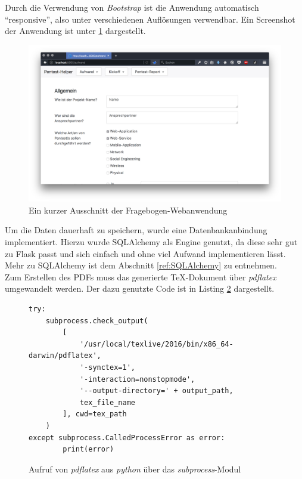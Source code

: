 Durch die Verwendung von \textit{Bootstrap} ist die Anwendung automatisch "`responsive"', also unter verschiedenen Auflösungen verwendbar. Ein Screenshot der Anwendung ist unter \ref{fig:FragWeb} dargestellt.

\begin{figure}[htbp]
	\centering
	\includegraphics[width=\textwidth]{bilder/pentest_prozesse/vorbereitung/fragebogen_web.png}
	\caption{Ein kurzer Ausschnitt der Fragebogen-Webanwendung}
	\label{fig:FragWeb}
\end{figure}

Um die Daten dauerhaft zu speichern, wurde eine Datenbankanbindung implementiert. Hierzu wurde SQLAlchemy als Engine genutzt, da diese sehr gut zu Flask passt und sich einfach und ohne viel Aufwand implementieren lässt. Mehr zu SQLAlchemy ist dem Abschnitt \ref{ref:SQLAlchemy} zu entnehmen.\\

Zum Erstellen des PDFs muss das generierte TeX-Dokument über \textit{pdflatex} umgewandelt werden. Der dazu genutzte Code ist in Listing \ref{lis:PenProzAufwPDFLatex} dargestellt.

\begin{figure}[htbp]
\begin{lstlisting}
try:
    subprocess.check_output(
        [
            '/usr/local/texlive/2016/bin/x86_64-darwin/pdflatex',
            '-synctex=1',
            '-interaction=nonstopmode',
            '--output-directory=' + output_path,
            tex_file_name
        ], cwd=tex_path
    )
except subprocess.CalledProcessError as error:
        print(error)
\end{lstlisting}
\caption{Aufruf von \textit{pdflatex} aus \textit{python} über das \textit{subprocess}-Modul}
\label{lis:PenProzAufwPDFLatex}
\end{figure}

